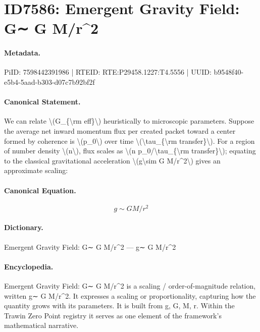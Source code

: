 \section*{ID7586: Emergent Gravity Field: G∼ G M/r\textasciicircum{}2}
\paragraph{Metadata.}
PiID: 7598442391986 | RTEID: RTE:P29458.1227:T4.5556 | UUID: b9548f40-e5b4-5aad-b303-d07c7b92bf2f

\paragraph{Canonical Statement.}
We can relate \textbackslash{}(G\_\{\textbackslash{}rm eff\}\textbackslash{}) heuristically to microscopic parameters. Suppose the average net inward momentum flux per created packet toward a center formed by coherence is \textbackslash{}(p\_0\textbackslash{}) over time \textbackslash{}(\textbackslash{}tau\_\{\textbackslash{}rm transfer\}\textbackslash{}). For a region of number density \textbackslash{}(n\textbackslash{}), flux scales as \textbackslash{}(n p\_0/\textbackslash{}tau\_\{\textbackslash{}rm transfer\}\textbackslash{}); equating to the classical gravitational acceleration \textbackslash{}(g\textbackslash{}sim G M/r\textasciicircum{}2\textbackslash{}) gives an approximate scaling:

\paragraph{Canonical Equation.}
\[
g\sim G M/r^2
\]

\paragraph{Dictionary.}
Emergent Gravity Field: G∼ G M/r\textasciicircum{}2 — g∼ G M/r\textasciicircum{}2

\paragraph{Encyclopedia.}
Emergent Gravity Field: G∼ G M/r\textasciicircum{}2 is a scaling / order-of-magnitude relation, written g∼ G M/r\textasciicircum{}2. It expresses a scaling or proportionality, capturing how the quantity grows with its parameters. It is built from g, G, M, r. Within the Trawin Zero Point registry it serves as one element of the framework's mathematical narrative.
